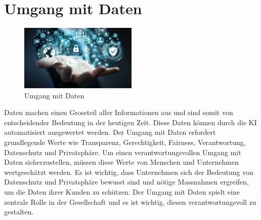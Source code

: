 \chapter{Umgang mit Daten}
\label{chap:Daten}
\begin{figure}[h]
    \centering
    \includegraphics[width=0.5\textwidth]{KI2.jpg} 
    \caption{Umgang mit Daten}
    \label{fig:ai}
\end{figure}

Daten machen einen Grossteil aller Informationen aus und sind somit von entscheidender Bedeutung in der heutigen Zeit. Diese Daten können durch die KI automatisiert ausgewertet werden. Der Umgang mit Daten erfordert grundlegende Werte wie Transparenz, Gerechtigkeit, Fairness, Verantwortung, Datenschutz und Privatsphäre. Um einen verantwortungsvollen Umgang mit Daten sicherzustellen, müssen diese Werte von Menschen und Unternehmen wertgeschätzt werden. Es ist wichtig, dass Unternehmen sich der Bedeutung von Datenschutz und Privatsphäre bewusst sind und nötige Massnahmen ergreifen, um die Daten ihrer Kunden zu schützen. Der Umgang mit Daten spielt eine zentrale Rolle in der Gesellschaft und es ist wichtig, diesen verantwortungsvoll zu gestalten.